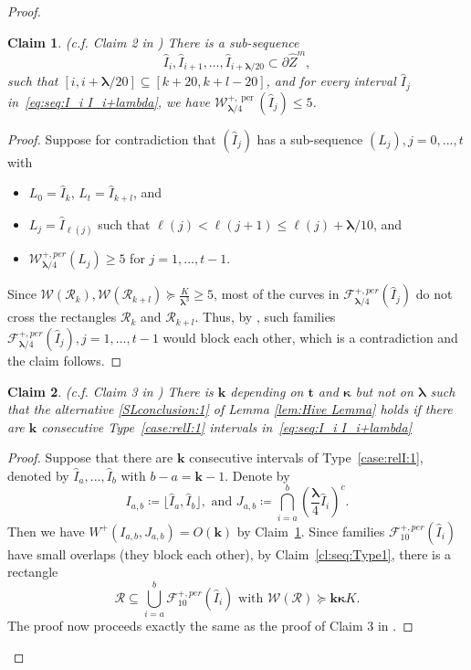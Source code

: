 \documentclass{amsart}
\newcommand{\1}{{\mathbb 1 }}
\newcommand{\blambda}{{\boldsymbol\lambda}}
\newcommand{\bkappa}{{\boldsymbol\kappa}}
\newcommand{\Width}{{\mathcal W}}
\newcommand{\wI}{{\widehat I}}
\newcommand{\wZ}{{\widehat Z}}
\newcommand\per{{\operatorname{per}}}
\newtheorem{claim}{Claim}
\theoremstyle{remark}
\numberwithin{equation}{section}
\theoremstyle{definition}
\begin{document}
\begin{proof}
\begin{claim}(c.f. Claim 2 in \cite[\S 8.2]{DL22})
\label{cl:seq:I_i}
There is a sub-sequence \begin{equation}
\label{eq:seq:I_i  I_i+lambda}
\wI_{i}, \wI_{i+1},\dots, \wI_{i+\blambda/20}\subset\partial \wZ^m,
\end{equation}
such that $[i, i+\blambda/20] \subseteq [k+20, k+l-20]$, and for
every interval $\wI_j$ in~\eqref{eq:seq:I_i  I_i+lambda}, we have $\Width^{+,\per}_{\blambda/4}(\wI_j)\leq 5$.
\end{claim} 
\begin{proof}
Suppose for contradiction that $(\wI_j)$ has a sub-sequence $(L_j), j = 0,..., t$ with 
\begin{itemize}
    \item $L_0 = \wI_k$, $L_t = \wI_{k+l}$, and 
    \item $L_j=\wI_{\ell(j)}$ such that $\ell(j)<\ell(j+1)\le \ell(j)+\blambda/10$, and
    \item $\Width_{\blambda/4}^{+, per}(L_j) \geq 5$ for $j = 1,..., t-1$.
\end{itemize}
Since $\Width(\mathcal{R}_k), \Width(\mathcal{R}_{k+l}) \succeq \frac{K}{\blambda^3} \geq 5$, most of the curves in $\mathcal{F}^{+, per}_{\blambda/4}(\wI_j)$ do not cross the rectangles $\mathcal{R}_k$ and $\mathcal{R}_{k+l}$.
Thus, by \cite[Lemma 6.14]{DL22}, such families $\mathcal{F}^{+, per}_{\blambda/4}(\wI_j), j = 1,..., t-1$ would block each other, which is a contradiction and the claim follows.
\end{proof}

\begin{claim}(c.f. Claim 3 in \cite[\S 8.2]{DL22})
There is $\mathbf{k}$ depending on $\mathbf{t}$ and $\bkappa$ but not on $\blambda$ such that the alternative \ref{SLconclusion:1} of Lemma \ref{lem:Hive Lemma} holds if there are $\mathbf{k}$ consecutive Type~\eqref{case:relI:1} intervals in~\eqref{eq:seq:I_i  I_i+lambda}
\end{claim}
\begin{proof}
    Suppose that there are $\mathbf{k}$ consecutive intervals of Type~\eqref{case:relI:1}, denoted by $\wI_a,..., \wI_b$ with $b-a = \mathbf{k}-1$. Denote by $$
    I_{a,b}\coloneqq \lfloor \wI_{a}, \wI_{b}\rfloor, \text{ and }
    J_{a,b}\coloneqq \bigcap_{i=a}^b (\frac{\blambda}{4}\wI_i)^c.
    $$
    Then we have $W^+(I_{a,b}, J_{a,b}) = O(\mathbf{k})$ by Claim~\ref{cl:seq:I_i}.
    Since families $\mathcal{F}^{+, per}_{10}(\wI_i)$ have small overlaps (they block each other), by Claim~\ref{cl:seq:Type1}, there is a rectangle
    $$
    \mathcal{R} \subseteq \bigcup_{i=a}^b\mathcal{F}^{+, per}_{10}(\wI_i) \text{ with } \Width(\mathcal{R}) \succeq \mathbf{k}\bkappa K.
    $$
    The proof now proceeds exactly the same as the proof of Claim 3 in \cite[\S 8.2]{DL22}.
\end{proof}


\end{proof}
\end{document}
